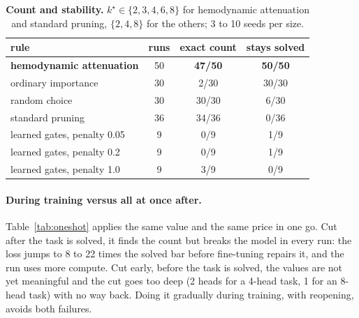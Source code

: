 \documentclass[11pt]{article}
\begin{document}
\begin{table}[h]
\centering
\begin{tabular}{lccc}
\toprule
rule & runs & exact count & stays solved \\
\midrule
\textbf{hemodynamic attenuation}            & 50 & \textbf{47/50} & \textbf{50/50} \\
ordinary importance                 & 30 & 2/30  & 30/30 \\
random choice                       & 30 & 30/30 & 6/30 \\
standard pruning \citep{michel}     & 36 & 34/36 & 0/36 \\
learned gates, penalty 0.05         & 9  & 0/9   & 1/9 \\
learned gates, penalty 0.2          & 9  & 0/9   & 1/9 \\
learned gates, penalty 1.0          & 9  & 3/9   & 0/9 \\
\bottomrule
\end{tabular}
\caption{\textbf{Count and stability.} $k^\star \in \{2, 3, 4, 6, 8\}$ for hemodynamic attenuation and
standard pruning, $\{2, 4, 8\}$ for the others; 3 to 10 seeds per size.}
\label{tab:rules}
\end{table}

\paragraph{During training versus all at once after.} Table~\ref{tab:oneshot} applies the same
value and the same price in one go. Cut after the task is solved, it finds the count but breaks
the model in every run: the loss jumps to 8 to 22 times the solved bar before fine-tuning repairs
it, and the run uses more compute. Cut early, before the task is solved, the values are not yet
meaningful and the cut goes too deep (2 heads for a 4-head task, 1 for an 8-head task) with no way
back. Doing it gradually during training, with reopening, avoids both failures.
\end{document}
